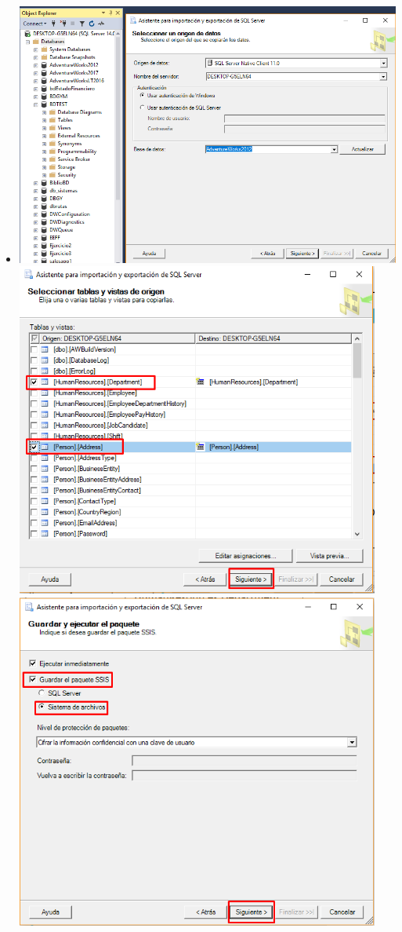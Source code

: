 \documentclass[12pt,letterpaper]{article}
\begin{document}
\begin{itemize}
	\item 
	\begin{center}
	\includegraphics[width=13cm]{./Imagenes/1}
	\includegraphics[width=12cm]{./Imagenes/2}
	\includegraphics[width=12cm]{./Imagenes/3}

\end{center}
\end{itemize}
\end{document}

